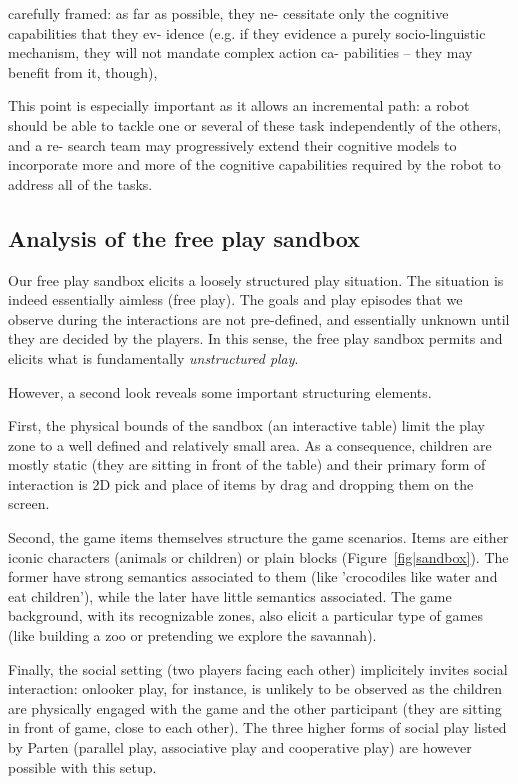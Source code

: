 \documentclass[a4paper]{article}
\begin{document}
carefully framed: as far as possible, they ne-
cessitate only the cognitive capabilities that they ev-
idence (e.g. if they evidence a purely socio-linguistic
mechanism, they will not mandate complex action ca-
pabilities – they may benefit from it, though),

This point is especially important as it allows an
incremental path: a robot should be able to tackle one or
several of these task independently of the others, and a re-
search team may progressively extend their cognitive models
to incorporate more and more of the cognitive capabilities
required by the robot to address all of the tasks.

\subsection{Analysis of the free play sandbox}

Our free play sandbox elicits a loosely structured play situation. The
situation is indeed essentially aimless (free play). The goals and play episodes
that we observe during the interactions are not pre-defined, and essentially
unknown until they are decided by the players. In this sense, the free play
sandbox permits and elicits what is fundamentally \emph{unstructured play}.

However, a second look reveals some important structuring elements.

First, the physical bounds of the sandbox (an interactive table) limit the
play zone to a well defined and relatively small area. As a consequence,
children are mostly static (they are sitting in front of the table) and their
primary form of interaction is 2D pick and place of items by drag and dropping
them on the screen.

Second, the game items themselves structure the game scenarios. Items are either
iconic characters (animals or children) or plain blocks
(Figure~\ref{fig|sandbox}). The former have strong semantics associated to them
(like 'crocodiles like water and eat children'), while the later have little
semantics associated. The game background, with its recognizable zones, also
elicit a particular type of games (like building a zoo or pretending we explore
the savannah).

Finally, the social setting (two players facing each other) implicitely invites
social interaction: onlooker play, for instance, is unlikely to be observed as
the children are physically engaged with the game and the other participant
(they are sitting in front of game, close to each other). The three higher forms
of social play listed by Parten (parallel play, associative play and cooperative
play) are however possible with this setup.
\end{document}
